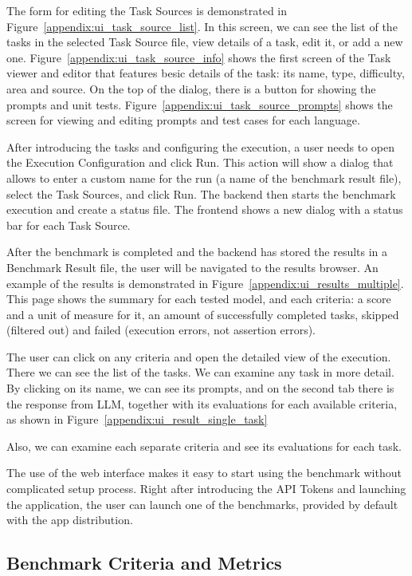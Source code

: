 The form for editing the Task Sources is demonstrated in Figure~\ref{appendix:ui_task_source_list}.
In this screen, we can see the list of the tasks in the selected Task Source file, view details of a task, edit it, or add a new one.
Figure~\ref{appendix:ui_task_source_info} shows the first screen of the Task viewer and editor that features besic details of the task: its name, type, difficulty, area and source.
On the top of the dialog, there is a button for showing the prompts and unit tests.
Figure~\ref{appendix:ui_task_source_prompts} shows the screen for viewing and editing prompts and test cases for each language.

After introducing the tasks and configuring the execution, a user needs to open the Execution Configuration and click Run.
This action will show a dialog that allows to enter a custom name for the run (a name of the benchmark result file), select the Task Sources, and click Run.
The backend then starts the benchmark execution and create a status file.
The frontend shows a new dialog with a status bar for each Task Source.

After the benchmark is completed and the backend has stored the results in a Benchmark Result file, the user will be navigated to the results browser.
An example of the results is demonstrated in Figure~\ref{appendix:ui_results_multiple}.
This page shows the summary for each tested model, and each criteria: a score and a unit of measure for it, an amount of successfully completed tasks, skipped (filtered out) and failed (execution errors, not assertion errors).

The user can click on any criteria and open the detailed view of the execution. %
There we can see the list of the tasks.
We can examine any task in more detail.
By clicking on its name, we can see its prompts, and on the second tab there is the response from LLM, together with its evaluations for each available criteria, as shown in Figure~\ref{appendix:ui_result_single_task}

Also, we can examine each separate criteria and see its evaluations for each task.

The use of the web interface makes it easy to start using the benchmark without complicated setup process.
Right after introducing the API Tokens and launching the application, the user can launch one of the benchmarks, provided by default with the app distribution.

\subsection{Benchmark Criteria and Metrics}

